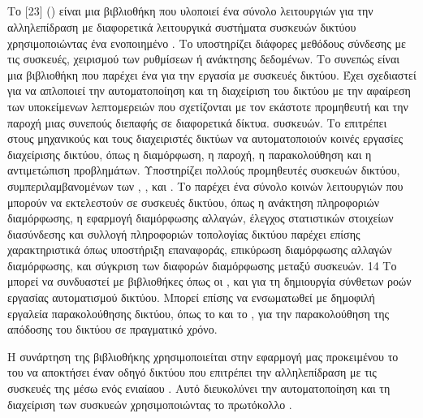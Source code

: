 \subsection{}
Το [23] () είναι μια βιβλιοθήκη  που υλοποιεί ένα σύνολο λειτουργιών για την αλληλεπίδραση με διαφορετικά λειτουργικά συστήματα συσκευών δικτύου χρησιμοποιώντας ένα ενοποιημένο .
Το  υποστηρίζει διάφορες μεθόδους σύνδεσης με τις συσκευές, χειρισμού των ρυθμίσεων ή ανάκτησης δεδομένων. Το  συνεπώς είναι μια βιβλιοθήκη  που παρέχει ένα 
 για την εργασία με συσκευές δικτύου. Έχει σχεδιαστεί για να απλοποιεί την
αυτοματοποίηση και τη διαχείριση του δικτύου με την αφαίρεση των υποκείμενων λεπτομερειών που σχετίζονται με τον εκάστοτε προμηθευτή και την παροχή μιας συνεπούς διεπαφής σε διαφορετικά δίκτυα. 
συσκευών.
Το  επιτρέπει στους μηχανικούς και τους διαχειριστές δικτύων να αυτοματοποιούν κοινές εργασίες διαχείρισης δικτύου, όπως η διαμόρφωση, η παροχή, η παρακολούθηση και η 
αντιμετώπιση προβλημάτων. Υποστηρίζει πολλούς προμηθευτές συσκευών δικτύου, συμπεριλαμβανομένων των , ,  και .
Το  παρέχει ένα σύνολο κοινών λειτουργιών που μπορούν να εκτελεστούν σε συσκευές δικτύου, όπως η ανάκτηση πληροφοριών διαμόρφωσης, η εφαρμογή διαμόρφωσης 
αλλαγών, έλεγχος στατιστικών στοιχείων διασύνδεσης και συλλογή πληροφοριών τοπολογίας δικτύου παρέχει επίσης χαρακτηριστικά όπως υποστήριξη επαναφοράς, επικύρωση διαμόρφωσης 
αλλαγών διαμόρφωσης, και σύγκριση των διαφορών διαμόρφωσης μεταξύ συσκευών.
14
Το  μπορεί να συνδυαστεί με βιβλιοθήκες  όπως οι ,  και  για τη δημιουργία σύνθετων ροών εργασίας αυτοματισμού δικτύου. Μπορεί επίσης να ενσωματωθεί 
με δημοφιλή εργαλεία παρακολούθησης δικτύου, όπως το  και το , για την παρακολούθηση της απόδοσης του δικτύου σε πραγματικό χρόνο.

Η συνάρτηση  της βιβλιοθήκης  
χρησιμοποιείται στην εφαρμογή μας  προκειμένου το   
του   να αποκτήσει έναν οδηγό δικτύου που επιτρέπει την 
αλληλεπίδραση με τις συσκευές της  μέσω ενός ενιαίαου . 
Αυτό διευκολύνει την αυτοματοποίηση και τη διαχείριση των συσκυεών 
χρησιμοποιώντας το πρωτόκολλο .




